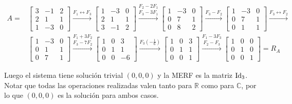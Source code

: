 \begin{enumerate}[topsep=6pt, itemsep=.4cm]
\begin{align*}
A = &\begin{bmatrix}3 & -1 & 2 \\2 & 1 & 1 \\1&-3&0\end{bmatrix}
\stackrel{F_1 \leftrightarrow F_3}{\longrightarrow}
\begin{bmatrix}1&-3&0\\2 & 1 & 1 \\3 & -1 & 2 \end{bmatrix}
\stackrel{F_2 - 2 F_1}{\stackrel{F_3 - 3 F_1}{\longrightarrow}}
\begin{bmatrix} 1 & -3 & 0 \\ 0 & 7 & 1 \\ 0 & 8 & 2 \end{bmatrix}
\stackrel{F_3-F_2}{\longrightarrow}
\begin{bmatrix} 1 & -3 & 0 \\ 0 & 7 & 1 \\ 0 & 1 & 1 \end{bmatrix}
\stackrel{F_3 \leftrightarrow F_2}{\longrightarrow} \\
&\begin{bmatrix} 1 & -3 & 0 \\ 0 & 1 & 1 \\ 0 & 7 & 1 \end{bmatrix}
\stackrel{F_1 + 3 F_2}{\stackrel{F_3-7F_2}{\longrightarrow}}
\begin{bmatrix} 1 & 0 & 3 \\ 0 & 1 & 1 \\ 0 & 0 & -6 \end{bmatrix}
\stackrel{F_3 (-\frac{1}{6}) }{\longrightarrow}
\begin{bmatrix} 1 & 0 & 3 \\ 0 & 1 & 1 \\ 0 & 0 & 1 \end{bmatrix}
\stackrel{F_1 - 3 F_3}{\stackrel{F_2 - F_3 }{\longrightarrow}}
\begin{bmatrix} 1 & 0 & 0 \\ 0 & 1 & 0 \\ 0 & 0 & 1 \end{bmatrix} = R_A
\end{align*}

Luego el sistema tiene solución trivial $(0,0,0)$ y la MERF es la matriz $\operatorname{Id}_3$. Notar que todas las operaciones realizadas valen tanto para $\mathbb{R}$ como para $\mathbb{C}$, por lo que $(0,0,0)$ es la solución para ambos casos.


\end{enumerate}
